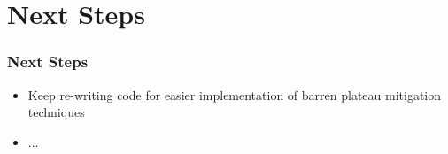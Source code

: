 \documentclass{beamer}
\begin{document}
\section{Next Steps}

\begin{frame}
\frametitle{Next Steps}
\begin{itemize}
\item Keep re-writing code for easier implementation of barren plateau mitigation techniques
\item ...
\end{itemize}
\end{frame}
\end{document}
